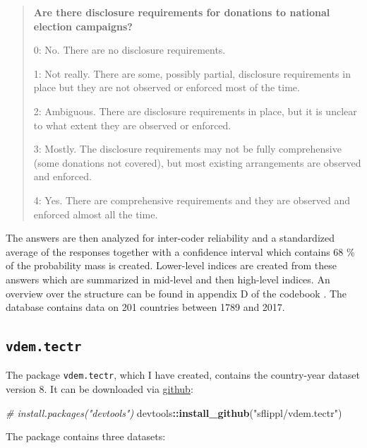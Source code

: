 \documentclass[]{report}
\newenvironment{Shaded}{\begin{snugshade}}{\end{snugshade}}
\newcommand{\KeywordTok}[1]{\textcolor[rgb]{0.13,0.29,0.53}{\textbf{#1}}}
\newcommand{\StringTok}[1]{\textcolor[rgb]{0.31,0.60,0.02}{#1}}
\newcommand{\CommentTok}[1]{\textcolor[rgb]{0.56,0.35,0.01}{\textit{#1}}}
\newcommand{\OperatorTok}[1]{\textcolor[rgb]{0.81,0.36,0.00}{\textbf{#1}}}
\newcommand{\NormalTok}[1]{#1}
\theoremstyle{definition}
\theoremstyle{definition}
\theoremstyle{definition}
\theoremstyle{remark}
\begin{document}
\begin{quote}
\textbf{Are there disclosure requirements for donations to national
election campaigns?}

0: No. There are no disclosure requirements.

1: Not really. There are some, possibly partial, disclosure requirements
in place but they are not observed or enforced most of the time.

2: Ambiguous. There are disclosure requirements in place, but it is
unclear to what extent they are observed or enforced.

3: Mostly. The disclosure requirements may not be fully comprehensive
(some donations not covered), but most existing arrangements are
observed and enforced.

4: Yes. There are comprehensive requirements and they are observed and
enforced almost all the time.
\end{quote}

The answers are then analyzed for inter-coder reliability and a
standardized average of the responses together with a confidence
interval which contains 68 \% of the probability mass is created.
Lower-level indices are created from these answers which are summarized
in mid-level and then high-level indices. An overview over the structure
can be found in appendix D of the codebook \citep{vdem-codebook2018}.
The database contains data on 201 countries between 1789 and 2017.
\citep[\citet{Pemstein2018}]{vdem2018}

\subsection{\texorpdfstring{\texttt{vdem.tectr}}{vdem.tectr}}\label{vdem.tectr}

The package \texttt{vdem.tectr}, which I have created, contains the
country-year dataset version 8. It can be downloaded via
\href{github.com/sflippl/vdem.tectr}{github}:

\begin{Shaded}
\begin{Highlighting}[]
\CommentTok{# install.packages("devtools")}
\NormalTok{devtools}\OperatorTok{::}\KeywordTok{install_github}\NormalTok{(}\StringTok{"sflippl/vdem.tectr"}\NormalTok{)}
\end{Highlighting}
\end{Shaded}

The package contains three datasets:
\end{document}

